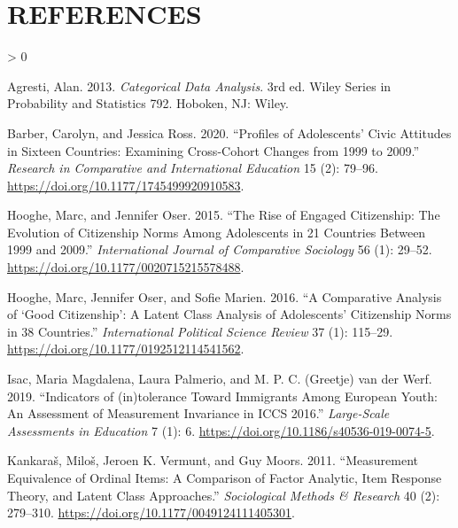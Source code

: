 \documentclass[
  11pt,
]{article}
\newlength{\cslhangindent}
\newenvironment{CSLReferences}[2] %
 {%
  \setlength{\parindent}{0pt}
  \ifodd #1 \everypar{\setlength{\hangindent}{\cslhangindent}}\ignorespaces\fi
  \ifnum #2 > 0
  \setlength{\parskip}{#2\baselineskip}
  \fi
 }%
 {}
\begin{document}
\newpage

\hypertarget{references}{%
\section*{REFERENCES}\label{references}}

\hypertarget{refs}{}
\begin{CSLReferences}{1}{0}
\leavevmode\hypertarget{ref-agresti_categorical_2013}{}%
Agresti, Alan. 2013. \emph{Categorical Data Analysis}. 3rd ed. Wiley
Series in Probability and Statistics 792. Hoboken, NJ: Wiley.

\leavevmode\hypertarget{ref-barber_profiles_2020}{}%
Barber, Carolyn, and Jessica Ross. 2020. {``Profiles of Adolescents'
Civic Attitudes in Sixteen Countries: {Examining} Cross-Cohort Changes
from 1999 to 2009.''} \emph{Research in Comparative and International
Education} 15 (2): 79--96.
\url{https://doi.org/10.1177/1745499920910583}.

\leavevmode\hypertarget{ref-hooghe_rise_2015}{}%
Hooghe, Marc, and Jennifer Oser. 2015. {``The Rise of Engaged
Citizenship: {The} Evolution of Citizenship Norms Among Adolescents in
21 Countries Between 1999 and 2009.''} \emph{International Journal of
Comparative Sociology} 56 (1): 29--52.
\url{https://doi.org/10.1177/0020715215578488}.

\leavevmode\hypertarget{ref-hooghe_comparative_2016}{}%
Hooghe, Marc, Jennifer Oser, and Sofie Marien. 2016. {``A Comparative
Analysis of {`Good Citizenship'}: {A} Latent Class Analysis of
Adolescents' Citizenship Norms in 38 Countries.''} \emph{International
Political Science Review} 37 (1): 115--29.
\url{https://doi.org/10.1177/0192512114541562}.

\leavevmode\hypertarget{ref-isac_indicators_2019}{}%
Isac, Maria Magdalena, Laura Palmerio, and M. P. C. (Greetje) van der
Werf. 2019. {``Indicators of (in)tolerance Toward Immigrants Among
{European} Youth: An Assessment of Measurement Invariance in {ICCS}
2016.''} \emph{Large-Scale Assessments in Education} 7 (1): 6.
\url{https://doi.org/10.1186/s40536-019-0074-5}.

\leavevmode\hypertarget{ref-kankaras_measurement_2011}{}%
Kankaraš, Miloš, Jeroen K. Vermunt, and Guy Moors. 2011. {``Measurement
{Equivalence} of {Ordinal} {Items}: {A} {Comparison} of {Factor}
{Analytic}, {Item} {Response} {Theory}, and {Latent} {Class}
{Approaches}.''} \emph{Sociological Methods \& Research} 40 (2):
279--310. \url{https://doi.org/10.1177/0049124111405301}.


\end{CSLReferences}
\end{document}
